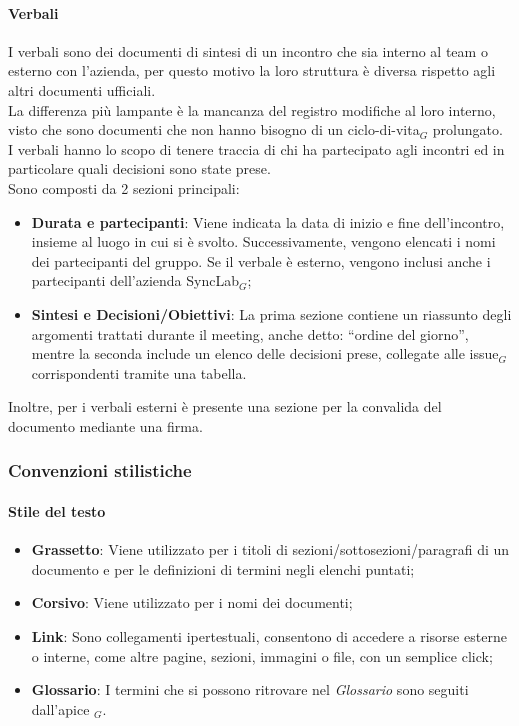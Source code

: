 \documentclass[10pt]{article}
\begin{document}
\begin{justify}
        \paragraph{Verbali}
        I verbali sono dei documenti di sintesi di un incontro che sia interno al team o esterno con l'azienda, per questo motivo la loro struttura è diversa rispetto agli altri documenti ufficiali.\\
        La differenza più lampante è la mancanza del registro modifiche al loro interno, visto che sono documenti che non hanno bisogno di un ciclo-di-vita$_G$ prolungato.\\
        I verbali hanno lo scopo di tenere traccia di chi ha partecipato agli incontri ed in particolare quali decisioni sono state prese.\\
        Sono composti da 2 sezioni principali:
        \begin{itemize}
            \item \textbf{Durata e partecipanti}: Viene indicata la data di inizio e fine dell'incontro, insieme al luogo in cui si è svolto. Successivamente, vengono elencati i nomi dei partecipanti del gruppo. Se il verbale è esterno, vengono inclusi anche i partecipanti dell'azienda SyncLab$_G$;
            \item \textbf{Sintesi e Decisioni/Obiettivi}: La prima sezione contiene un riassunto degli argomenti trattati durante il meeting, anche detto: ``ordine del giorno'', mentre la seconda include un elenco delle decisioni prese, collegate alle issue$_G$ corrispondenti tramite una tabella.
        \end{itemize}
        Inoltre, per i verbali esterni è presente una sezione per la convalida del documento mediante una firma.\\

    \subsubsection{Convenzioni stilistiche}
        \paragraph{Stile del testo}
        \begin{itemize}
            \item \textbf{Grassetto}: Viene utilizzato per i titoli di sezioni/sottosezioni/paragrafi di un documento e per le definizioni di termini negli elenchi puntati;
            \item \textbf{Corsivo}: Viene utilizzato per i nomi dei documenti;
            \item \textbf{Link}: Sono collegamenti ipertestuali, consentono di accedere a risorse esterne o interne, come altre pagine, sezioni, immagini o file, con un semplice click;
            \item \textbf{Glossario}: I termini che si possono ritrovare nel \textit{Glossario} sono seguiti dall'apice $_G$.
        \end{itemize}


\end{justify}
\end{document}
